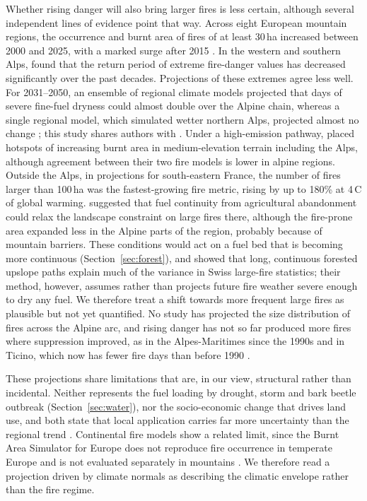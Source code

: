 \documentclass[11pt,a4paper]{article}
\begin{document}
Whether rising danger will also bring larger fires is less certain, although several independent lines of evidence point that way. Across eight European mountain regions, the occurrence and burnt area of fires of at least 30\,ha increased between 2000 and 2025, with a marked surge after 2015 \citep{beloiu_climatedriven_2026}. In the western and southern Alps, \citet{wastl_recent_2012} found that the return period of extreme fire-danger values has decreased significantly over the past decades. Projections of these extremes agree less well. For 2031--2050, an ensemble of regional climate models projected that days of severe fine-fuel dryness could almost double over the Alpine chain, whereas a single regional model, which simulated wetter northern Alps, projected almost no change \citep{cane_projection_2013}; this study shares authors with \citet{wastl_recent_2012}. Under a high-emission pathway, \citet{billing_future_2026} placed hotspots of increasing burnt area in medium-elevation terrain including the Alps, although agreement between their two fire models is lower in alpine regions. Outside the Alps, in projections for south-eastern France, the number of fires larger than 100\,ha was the fastest-growing fire metric, rising by up to 180\% at 4\,\degree{}C of global warming. \citet{pimont_future_2023} suggested that fuel continuity from agricultural abandonment could relax the landscape constraint on large fires there, although the fire-prone area expanded less in the Alpine parts of the region, probably because of mountain barriers. These conditions would act on a fuel bed that is becoming more continuous (Section~\ref{sec:forest}), and \citet{conedera_linking_2024} showed that long, continuous forested upslope paths explain much of the variance in Swiss large-fire statistics; their method, however, assumes rather than projects future fire weather severe enough to dry any fuel. We therefore treat a shift towards more frequent large fires as plausible but not yet quantified. No study has projected the size distribution of fires across the Alpine arc, and rising danger has not so far produced more fires where suppression improved, as in the Alpes-Maritimes since the 1990s and in Ticino, which now has fewer fire days than before 1990 \citep{muller_forest_2020}.

These projections share limitations that are, in our view, structural rather than incidental. Neither represents the fuel loading by drought, storm and bark beetle outbreak (Section~\ref{sec:water}), nor the socio-economic change that drives land use, and both state that local application carries far more uncertainty than the regional trend \citep{gerberding_mapping_2025}. Continental fire models show a related limit, since the Burnt Area Simulator for Europe does not reproduce fire occurrence in temperate Europe and is not evaluated separately in mountains \citep{forrest_understanding_2024}. We therefore read a projection driven by climate normals as describing the climatic envelope rather than the fire regime.
\end{document}
